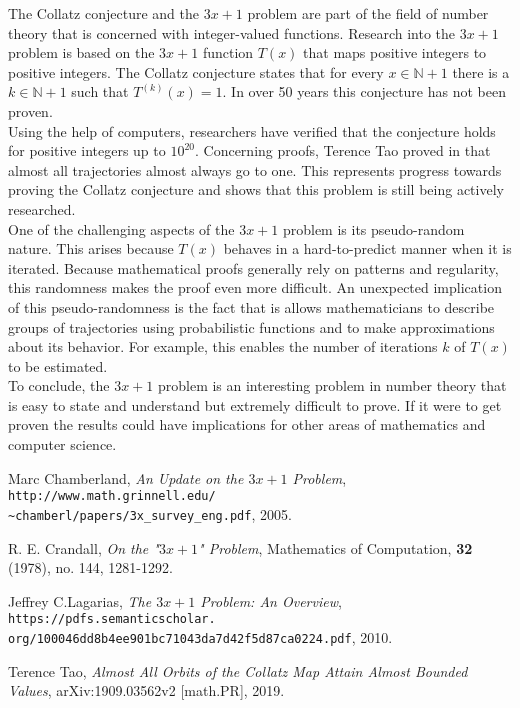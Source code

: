\documentclass[12pt,a4paper,reqno]{amsart}
\begin{document}
The Collatz conjecture and the $3x+1$ problem are part of the field
of number theory that is concerned with integer-valued functions. Research into
the $3x+1$ problem is based on the $3x+1$ function $T(x)$ that maps positive
integers to positive integers. The Collatz conjecture states that for every $x \in
\mathbb{N} + 1$ there is a $k \in \mathbb{N} + 1$ such that $T^{(k)}(x)=1$. In
over 50 years this conjecture has not been proven. \\
Using the help of computers, researchers have verified that the conjecture
holds for positive integers up to $10^{20}$. Concerning proofs, Terence Tao
proved in \cite{src:04} that almost all trajectories almost always go to one.
This represents progress towards proving the Collatz conjecture and shows that
this problem is still being actively researched. \\
One of the challenging aspects of the $3x+1$ problem is its pseudo-random
nature. This arises because $T(x)$ behaves in a hard-to-predict manner when it
is iterated. Because mathematical proofs generally rely on patterns and
regularity, this randomness makes the proof even more difficult. An unexpected
implication of this pseudo-randomness is the fact that is allows mathematicians
to describe groups of trajectories using probabilistic functions and to make
approximations about its behavior. For example, this enables the number of
iterations $k$ of $T(x)$ to be estimated. \\
To conclude, the $3x+1$ problem is an interesting problem in number theory that
is easy to state and understand but extremely difficult to prove. If it were to
get proven the results could have implications for other areas of mathematics
and computer science.

\newpage

\begin{thebibliography}{4}

 Marc Chamberland, 
    \textit{An Update on the $3x+1$ Problem},
    \texttt{http://www.math.grinnell.edu/\\
        \~{}chamberl/papers/3x\_survey\_eng.pdf}, 2005.

 R. E. Crandall, \textit{On the "$3x+1$" Problem},
    Mathematics of Computation, \textbf{32} (1978), no. 144, 1281-1292.

 Jeffrey C.Lagarias, 
    \textit{The $3x+1$ Problem: An Overview},
    \texttt{https://pdfs.semanticscholar.\\
        org/100046dd8b4ee901bc71043da7d42f5d87ca0224.pdf}, 2010.

 Terence Tao, \textit{Almost All Orbits of the Collatz Map Attain
    Almost Bounded Values}, arXiv:1909.03562v2 [math.PR], 2019.

\end{thebibliography}
\end{document}
